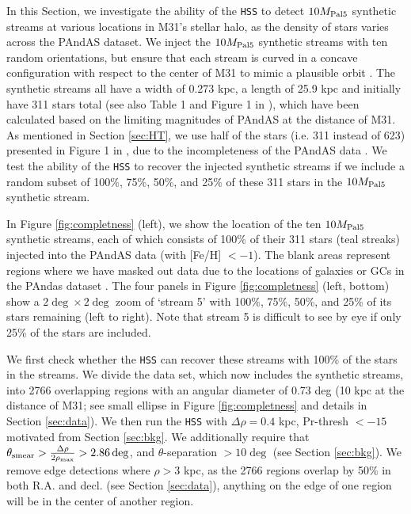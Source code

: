 \documentclass[twocolumn]{aastex631}
\begin{document}
In this Section, we investigate the ability of the \texttt{HSS} to detect $10{M}_{\rm Pal 5}$ synthetic streams at various locations in M31's stellar halo, as the density of stars varies across the PAndAS dataset. We inject the $10{M}_{\rm Pal 5}$ synthetic streams with ten random orientations, but ensure that each stream is curved in a concave configuration with respect to the center of M31 to mimic a plausible orbit  \citep[e.g.,][]{johnston01}. The synthetic streams all have a width of 0.273 kpc, a length of 25.9 kpc and initially have 311 stars total (see also Table 1 and Figure 1 in ), which have been calculated based on the limiting magnitudes of PAndAS at the distance of M31. As mentioned in Section \ref{sec:HT}, we use half of the stars (i.e. 311 instead of 623) presented in Figure 1 in  , due to the incompleteness of the PAndAS data \citep[]{martin16}. We test the ability of the \texttt{HSS} to recover the injected synthetic streams if we include a random subset of 100\%, 75\%, 50\%, and 25\% of these 311 stars in the $10{M}_{\rm Pal 5}$ synthetic stream.  

In Figure \ref{fig:completness} (left), we show the location of the ten $10{M}_{\rm Pal 5}$ synthetic streams, each of which consists of 100\% of their 311 stars (teal streaks) injected into the PAndAS data (with [Fe/H] $< -1$). The blank areas represent regions where we have masked out data due to the locations of galaxies or GCs in the PAndas dataset \citep[see][and Section \ref{sec:data}]{huxor14,martin17,McConnachie19}. The four panels in Figure \ref{fig:completness} (left, bottom) show a $2\deg \times2\deg$ zoom of `stream 5' with 100\%, 75\%, 50\%, and 25\% of its stars remaining (left to right). Note that stream 5 is difficult to see by eye if only 25\% of the stars are included. 

We first check whether the \texttt{HSS} can recover these streams with 100\% of the stars in the streams. We divide the data set, which now includes the synthetic  streams, into 2766 overlapping regions with an angular diameter of 0.73 deg (10 kpc at the distance of M31; see small ellipse in Figure \ref{fig:completness} and  details in Section \ref{sec:data}). We then run the \texttt{HSS} with $\Delta \rho = 0.4$ kpc, Pr-thresh $< -15$ motivated from Section \ref{sec:bkg}. We additionally require that $\theta_{\rm smear} > \frac{\Delta \rho}{2\rho_{\rm max}} > 2.86 \deg$, and $\theta$-separation $>10\deg$ (see Section \ref{sec:bkg}). We remove edge detections where $\rho>3$ kpc, as the 2766 regions overlap by 50\% in both R.A. and decl. (see Section \ref{sec:data}),  anything on the edge of one region will be in the center of another region. 
\end{document}
